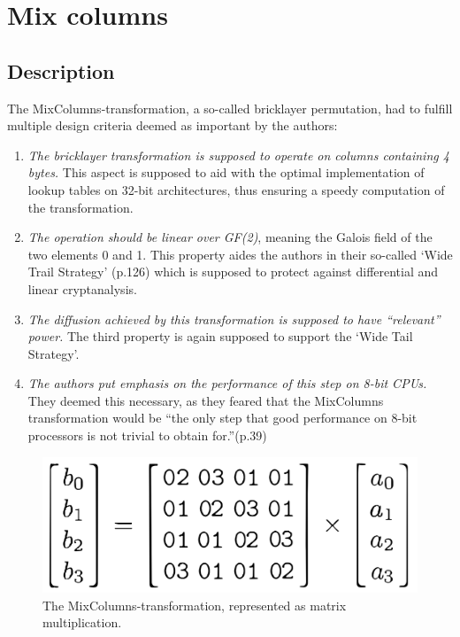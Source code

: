 \hypertarget{mix-columns}{%
\section{Mix columns}\label{mix-columns}}

\hypertarget{description-4}{%
\subsection{Description}\label{description-4}}

The MixColumns-transformation, a so-called bricklayer permutation, had to fulfill
\cite[p.39]{rijndael} multiple design criteria deemed as important by the authors:

\begin{enumerate}
\def\labelenumi{\arabic{enumi}.}

\item
  \emph{The bricklayer transformation is supposed to operate on columns
  containing 4 bytes.} This aspect is supposed to aid with the optimal
  implementation of lookup tables on 32-bit architectures, thus
  ensuring a speedy computation of the transformation.
\item
  \emph{The operation should be linear over GF(2)}, meaning the Galois
  field of the two elements 0 and 1. This property aides the authors in
  their so-called `Wide Trail Strategy' (p.126) which is supposed to
  protect against differential and linear cryptanalysis.
\item
  \emph{The diffusion achieved by this transformation is supposed to
  have ``relevant'' power.} The third property is again supposed to
  support the `Wide Tail Strategy'.
\item
  \emph{The authors put emphasis on the performance of this step on 8-bit
  CPUs.} They deemed this necessary, as they feared that the MixColumns
  transformation would be ``the only step that good performance on 8-bit
  processors is not trivial to obtain for.''(p.39)
\end{enumerate}


\begin{figure}
\centering
\includegraphics[scale = 0.2]{data/figures/mixcolumn.png}
\caption{The MixColumns-transformation, represented as matrix multiplication.}
\label{fig:mixcolumn}
\end{figure}

